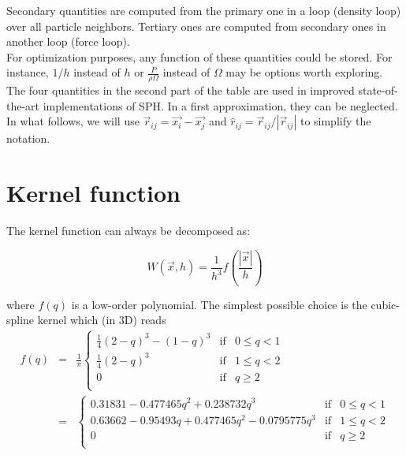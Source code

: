 \documentclass[a4paper,10pt]{article}
\begin{document}
Secondary quantities are computed from the primary one in a loop (density loop) over all particle neighbors. Tertiary
ones are computed from secondary ones in another loop (force loop). \\

For optimization purposes, any function of these quantities could be stored. For instance, $1/h$ instead of $h$ or
$\frac{P}{\rho\Omega}$ instead of $\Omega$ may be options worth exploring. \\

The four quantities in the second part of the table are used in improved state-of-the-art implementations of SPH. In a
first approximation, they can be neglected. \\

In what follows, we will use $\vec{r}_{ij} = \vec{x_i} - \vec{x_j}$ and $\hat{r}_{ij} = \vec{r}_{ij}/|\vec{r}_{ij}|$
to simplify the notation.

\section{Kernel function}

The kernel function can always be decomposed as:

\begin{equation}
 W(\vec{x}, h) = \frac{1}{h^3}f\left(\frac{|\vec{x}|}{h}\right) 
\end{equation}

where $f(q)$ is a low-order polynomial. The simplest possible choice is the cubic-spline kernel which (in 3D) reads
\begin{eqnarray*}
 f(q) &=& \frac{1}{\pi}\left\lbrace \begin{array}{rcl}
                      \frac{1}{4}(2-q)^3 - (1-q)^3 & \mbox{if} & 0 \leq q < 1 \\
		      \frac{1}{4}(2-q)^3 & \mbox{if} & 1 \leq q < 2 \\
		      0 & \mbox{if} & q \geq 2 \\
                     \end{array}
 \right. \\
&=&\left\lbrace \begin{array}{rcl}
    0.31831 -0.477465 q^2+0.238732 q^3& \mbox{if} & 0 \leq q < 1 \\
   0.63662 -0.95493 q+0.477465 q^2-0.0795775 q^3  & \mbox{if} & 1 \leq q < 2 \\
		      0 & \mbox{if} & q \geq 2 \\
                     \end{array}
 \right.
\end{eqnarray*}
\end{document}
